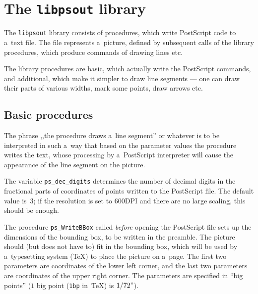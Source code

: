 

\chapter{The \texttt{libpsout} library}

The \texttt{libpsout} library consists of procedures, which write
PostScript\raisebox{3pt}{\tiny(TM)} code to a~text file. The file
represents a~picture, defined by subsequent calls of the library
procedures, which produce commands of drawing lines etc.

The library procedures are basic, which actually write the PostScript
commands, and additional, which make it simpler to draw line
segments --- one can draw their parts of various widths, mark some
points, draw arrows etc.


\section{Basic procedures}

The phrase ,,the procedure draws a~line segment'' or whatever is to
be interpreted in such a~way that based on the parameter values the procedure
writes the text, whose processing by a~PostScript interpreter will cause
the appearance of the line segment on the picture.

\vspace{\bigskipamount}
The variable \texttt{ps\_dec\_digits} determines the number of decimal digits
in the fractional parts of coordinates of points written to the PostScript
file. The default value is~$3$; if the resolution is set to $600$DPI and
there are no large scaling, this should be enough.

\vspace{\bigskipamount}
The procedure \texttt{ps\_WriteBBox} called \emph{before} opening the
PostScript file sets up the dimensions of the bounding box, to be written
in the preamble. The picture should (but does not have to) fit in the
bounding box, which will be used by a~typesetting system (\TeX) to place
the picture on a~page.
The first two parameters are coordinates of the lower left corner, and
the last two parameters are coordinates of the upper right corner.
The parameters are specified in ``big points''
($1$ big point (\texttt{1bp} in~\TeX) is $1/72"$).

